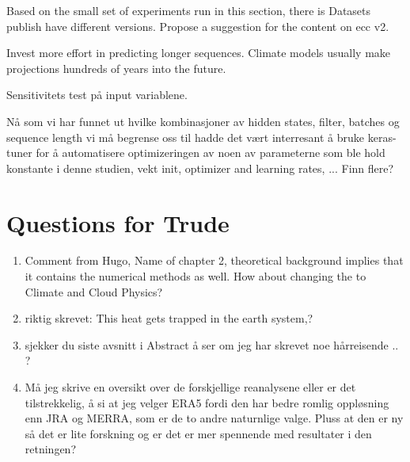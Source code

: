 Based on the small set of experiments run in this section, there is 
Datasets publish have different versions. Propose a suggestion for the content on \acrshort{ecc} v2.

Invest more effort in predicting longer sequences. Climate models usually make projections hundreds of years into the future.

Sensitivitets test på input variablene.


Nå som vi har funnet ut hvilke kombinasjoner av hidden states, filter, batches og sequence length vi må begrense oss til hadde det vært interresant å bruke keras-tuner for å automatisere optimizeringen av noen av parameterne som ble hold konstante i denne studien, vekt init, optimizer and learning rates, ... Finn flere?


\section{Questions for Trude}

\begin{enumerate}
    \item Comment from Hugo, Name of chapter 2, theoretical background implies that it contains the numerical methods as well. How about changing the to Climate and Cloud Physics?
    \item riktig skrevet: This heat gets trapped in the earth system,?
    \item sjekker du siste avsnitt i Abstract å ser om jeg har skrevet noe hårreisende .. ?
    \item Må jeg skrive en oversikt over de forskjellige reanalysene eller er det tilstrekkelig, å si at jeg velger ERA5 fordi den har bedre romlig oppløsning enn JRA og MERRA, som er de to andre naturnlige valge. Pluss at den er ny så det er lite forskning og er det er mer spennende med resultater i den retningen?
\end{enumerate}